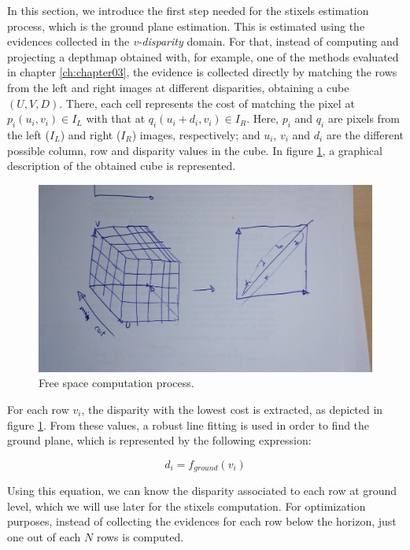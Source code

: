 In this section, we introduce the first step needed for the stixels estimation process, which is the ground plane estimation. This is estimated using the evidences collected in the \emph{v-disparity} domain. For that, instead of computing and projecting a depthmap obtained with, for example, one of the methods evaluated in chapter \ref{ch:chapter03}, the evidence is collected directly by matching the rows from the left and right images at different disparities, obtaining a cube $(U, V, D)$. There, each cell represents the cost of matching the pixel at $p_i(u_i, v_i) \in I_L$ with that at $q_i(u_i + d_i, v_i) \in I_R$. Here, $p_i$ and $q_i$ are pixels from the left ($I_L$) and right ($I_R$) images, respectively; and $u_i$, $v_i$ and $d_i$ are the different possible column, row and disparity values in the cube. In figure \ref{fig:cp04_freespace}, a graphical description of the obtained cube is represented.

\begin{figure}[h!]
  \centering
  \includegraphics[width=\textwidth]{freespace}
  \caption{Free space computation process.}\label{fig:cp04_freespace}
\end{figure}

For each row $v_i$, the disparity with the lowest cost is extracted, as depicted in figure \ref{fig:cp04_freespace}. From these values, a robust line fitting is used in order to find the ground plane, which is represented by the following expression:

\begin{equation}\label{eq:cp04_ground_plane_function}
  d_i = f_{ground}(v_i)
\end{equation}

Using this equation, we can know the disparity associated to each row at ground level, which we will use later for the stixels computation. For optimization purposes, instead of collecting the evidences for each row below the horizon, just one out of each $N$ rows is computed. 

